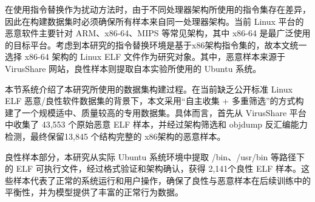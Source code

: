 在使用指令替换作为扰动方法时，由于不同处理器架构所使用的指令集存在差异，因此在构建数据集时必须确保所有样本来自同一处理器架构。当前 Linux 平台的恶意软件主要针对 ARM、x86-64、MIPS 等常见架构，其中 x86-64 是最广泛使用的目标平台。考虑到本研究的指令替换环境是基于x86架构指令集的，故本文统一选择 x86-64 架构的 Linux ELF 文件作为研究对象。其中，恶意样本来源于 VirusShare 网站，良性样本则提取自本实验所使用的 Ubuntu 系统。


本节系统介绍了本研究所使用的数据集构建过程。在当前缺乏公开标准 Linux ELF 恶意/良性软件数据集的背景下，本文采用“自主收集 + 多重筛选”的方式构建了一个规模适中、质量较高的专用数据集。具体而言，首先从 VirusShare 平台中收集了 43,553 个原始恶意 ELF 样本，并经过架构筛选和 objdump 反汇编能力检测，最终保留13,845 个结构完整的 x86架构的恶意样本。


良性样本部分，本研究从实际 Ubuntu 系统环境中提取 /bin、/usr/bin 等路径下的 ELF 可执行文件，经过格式验证和架构确认，获得 2,141个良性 ELF 样本。这些样本代表了正常的系统运行和用户操作，确保了良性与恶意样本在后续训练中的平衡性，并为模型提供了丰富的正常行为数据。


